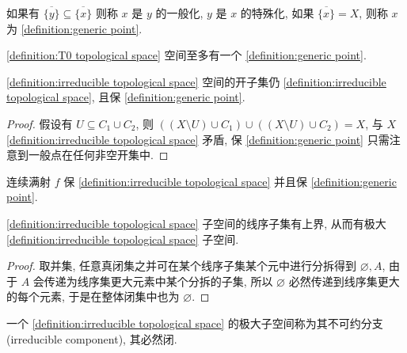 \begin{definition}
    \label {definition:generic point}
    如果有 \(\overline{\{y\}} \subseteq \overline{\{x\}}\) 则称 \(x\) 是 \(y\) 的一般化,
    \(y\) 是 \(x\) 的特殊化, 如果 \(\overline{\{x\}} = X\), 则称 \(x\) 为 \ref{definition:generic point}.
\end{definition}

\begin{corollary}
    \ref{definition:T0 topological space} 空间至多有一个 \ref{definition:generic point}.
\end{corollary}

\begin{lemma}
    \ref{definition:irreducible topological space} 空间的开子集仍 \ref{definition:irreducible topological space},
    且保 \ref{definition:generic point}.

    \begin{proof}
        假设有 \(U \subseteq C_1 \cup C_2\), 则 \(((X \setminus U) \cup C_1) \cup ((X \setminus U) \cup C_2) = X\), 
        与 \(X\) \ref{definition:irreducible topological space} 矛盾, 保 \ref{definition:generic point} 只需注意到一般点在任何非空开集中.
    \end{proof}
\end{lemma}

\begin{lemma}
    连续满射 \(f\) 保 \ref{definition:irreducible topological space} 并且保 \ref{definition:generic point}.
\end{lemma}

\begin{lemma}
    \ref{definition:irreducible topological space} 子空间的线序子集有上界, 从而有极大 \ref{definition:irreducible topological space} 子空间.

    \begin{proof}
        取并集, 任意真闭集之并可在某个线序子集某个元中进行分拆得到 \(\varnothing,A\), 由于 \(A\) 会传递为线序集更大元素中某个分拆的子集,
        所以 \(\varnothing\) 必然传递到线序集更大的每个元素, 于是在整体闭集中也为 \(\varnothing\).
    \end{proof}
\end{lemma}

\begin{definition}
    \label {definition:irreducible component}
    一个 \ref{definition:irreducible topological space} 的极大子空间称为其不可约分支 (irreducible component), 其必然闭.
\end{definition}

